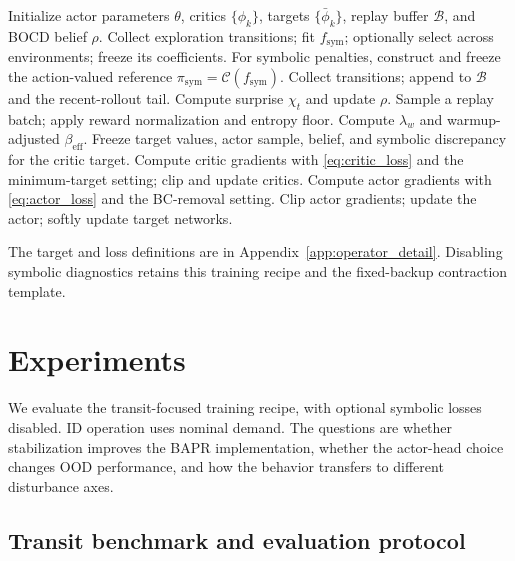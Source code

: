 \documentclass[10pt]{article}
\begin{document}
\begin{algorithm}[H]
\caption{CS-BAPR training with optional symbolic diagnostics}
\label{alg:csbapr}
\begin{algorithmic}[1]
\STATE Initialize actor parameters $\theta$, critics $\{\phi_k\}$, targets $\{\bar\phi_k\}$, replay buffer $\mathcal{B}$, and BOCD belief $\rho$.
    \STATE Collect exploration transitions; fit $f_{\mathrm{sym}}$; optionally select across environments; freeze its coefficients.
    \STATE For symbolic penalties, construct and freeze the action-valued reference $\pi_{\mathrm{sym}}=\mathcal C(f_{\mathrm{sym}})$.
\ENDIF
{}
    \STATE Collect transitions; append to $\mathcal{B}$ and the recent-rollout tail.
    \STATE Compute surprise $\chi_t$ and update $\rho$.
        \STATE Sample a replay batch; apply reward normalization and entropy floor.
        \STATE Compute $\lambda_w$ and warmup-adjusted $\beta_{\mathrm{eff}}$.
        \STATE Freeze target values, actor sample, belief, and symbolic discrepancy for the critic target.
        \STATE Compute critic gradients with \eqref{eq:critic_loss} and the minimum-target setting; clip and update critics.
        \STATE Compute actor gradients with \eqref{eq:actor_loss} and the BC-removal setting.
        \STATE Clip actor gradients; update the actor; softly update target networks.
    \ENDFOR
\ENDFOR
\end{algorithmic}
\end{algorithm}
The target and loss definitions are in Appendix~\ref{app:operator_detail}. Disabling symbolic diagnostics retains this training recipe and the fixed-backup contraction template.

\section{Experiments}
\label{sec:experiments}

We evaluate the transit-focused training recipe, with optional symbolic losses disabled. ID operation uses nominal demand. The questions are whether stabilization improves the BAPR implementation, whether the actor-head choice changes OOD performance, and how the behavior transfers to different disturbance axes.

\subsection{Transit benchmark and evaluation protocol}
\end{document}
